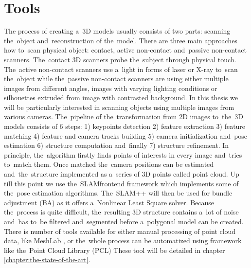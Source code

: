 \section{Tools}
\label{sec:tools}
The process of creating a~3D models usually consists of two parts: scanning the~object and~reconstruction of the~model. There are three main approaches how to~scan physical object: contact, active non-contact  and~passive non-contact scanners. The~contact 3D scanners probe the~subject through physical touch. The~active non-contact scanners use a~light in forms of laser or X-ray to~scan the~object while the~passive non-contact scanners are using either multiple images from different angles, images with varying lighting conditions or silhouettes extruded from image with contrasted background. In this thesis we will be particularly interested in scanning objects using multiple images from various cameras. The~pipeline of the~transformation from 2D images to~the~3D models consists of 6 steps: 1) keypoints detection 2) feature extraction  3) feature matching 4) feature and camera tracks building 5) camera initialization and~pose estimation 6) structure computation and~finally 7) structure refinement. In principle, the~algorithm firstly finds points of interests in every image and~tries to~match them. Once matched the~camera positions can be estimated and~the~structure implemented as a~series of 3D points called point cloud. Up till this point we use the~SLAM\textunderscore frontend framework \cite{www:slam_frontend} which implements some of the~pose estimation algorithms. The~SLAM++ will then be used for bundle adjustment (BA) as it offers a~Nonlinear Least Square solver. Because the~process is quite difficult, the~resulting 3D structure contains a~lot of noise and~has to~be filtered and~segmented before a~polygonal model can be created. There is number of tools available for either manual processing of point cloud data, like MeshLab \cite{www:MeshLab}, or the~whole process can be automatized using framework like the~Point Cloud Library (PCL) \cite{www:pcl} These tool will be detailed in chapter \ref{chapter:the-state-of-the-art}. 

